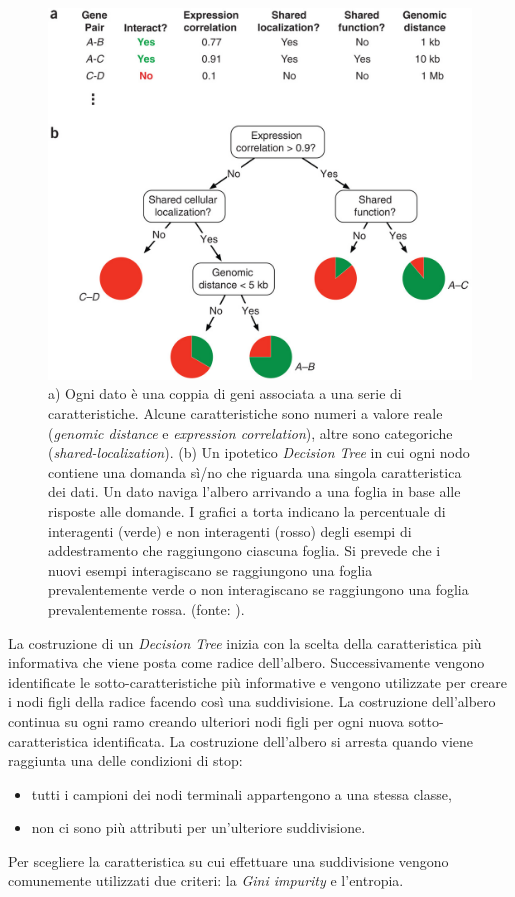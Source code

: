 \documentclass[12pt,italian]{report}
\begin{document}
	\begin{figure}[h!]
		\centering
		\includegraphics[width=0.7\linewidth]{immagini/DecisionTreeExample2.jpg}
		\caption{a) Ogni dato è una coppia di geni associata a una serie di caratteristiche. Alcune caratteristiche sono numeri a valore reale (\textit{genomic distance} e \textit{expression correlation}), altre sono categoriche (\textit{shared-localization}). (b) Un ipotetico \textit{Decision Tree} in cui ogni nodo contiene una domanda sì/no che riguarda una singola caratteristica dei dati. Un dato naviga l'albero arrivando a una foglia in base alle risposte alle domande. I grafici a torta indicano la percentuale di interagenti (verde) e non interagenti (rosso) degli esempi di addestramento che raggiungono ciascuna foglia. Si prevede che i nuovi esempi interagiscano se raggiungono una foglia prevalentemente verde o non interagiscano se raggiungono una foglia prevalentemente rossa. (fonte: \cite{kingsford2008decision}).}
		\label{fig:DecisionTree}
	\end{figure}
	La costruzione di un \textit{Decision Tree} inizia con la scelta della caratteristica più informativa che viene posta come radice dell'albero. Successivamente vengono identificate le sotto-caratteristiche più informative e vengono utilizzate per creare i nodi figli della radice facendo così una suddivisione. La costruzione dell'albero continua su ogni ramo creando ulteriori nodi figli per ogni nuova sotto-caratteristica identificata. La costruzione dell'albero si arresta quando viene raggiunta una delle condizioni di stop:
	\begin{itemize}
		\item tutti i campioni dei nodi terminali appartengono a una stessa classe,
		\item non ci sono più attributi per un'ulteriore suddivisione.
	\end{itemize}
	Per scegliere la caratteristica su cui effettuare una suddivisione vengono comunemente utilizzati due criteri: la \textit{Gini impurity} e l'entropia.
	
\end{document}
